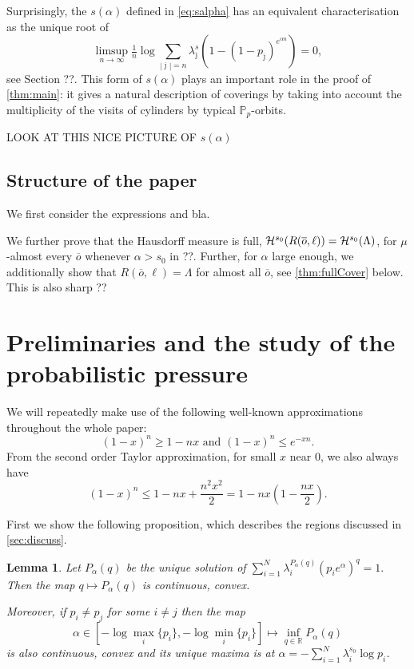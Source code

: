\documentclass[12pt,]{article}
\newtheorem{lemma}[theorem]{Lemma}
\theoremstyle{definition}
\theoremstyle{remark}
\renewcommand{\Bbb}[1]{\mathbb{#1}}
\newcommand{\bbP}{{\Bbb P}}
\newcommand{\bbR}{{\Bbb R}}        %
\newcommand{\cH}{{\cal H}}
\newcommand{\0}{\mathbf{0}}
\renewcommand{\le}{\leq}
\renewcommand{\ge}{\geq}
\newcommand{\bj}{{\overline  {\jmath}}}
\newcommand{\bo}{{\overline o}}
\begin{document}
Surprisingly, the $s(\alpha)$ defined in \cref{eq:salpha} has an equivalent characterisation as the unique root of
\begin{equation}\label{eq:probpres}
  \limsup_{n\to \infty} \tfrac 1n \log \sum_{|\bj|=n}\lambda_{\bj}^{s}\left(1-(1-p_{\bj})^{e^{\alpha n}}\right)=0,
\end{equation}
see Section ??. This form of $s(\alpha)$ plays an important role in the proof of \cref{thm:main}: it
gives a natural description of coverings by taking into account the multiplicity of the visits of
cylinders by typical $\bbP_p$-orbits.

{\color{red} LOOK AT THIS NICE PICTURE OF $s(\alpha)$}





\subsection{Structure of the paper}

We first consider the expressions and bla.

We further prove that the Hausdorff measure is full,
$\cH^{s_0}(R(\bo,\ell))=\cH^{s_0}(\Lambda)$, for $\mu$-almost every $\bo$ whenever
$\alpha>s_0$ in ??. Further, for $\alpha$ large enough, we additionally show that
$R(\bo,\ell)=\Lambda$ for almost all $\bo$, see \cref{thm:fullCover} below. This is also sharp ??

\section{Preliminaries and the study of the probabilistic pressure}

We will repeatedly make use of the following well-known approximations throughout the whole paper:
\begin{equation}\label{eq:repeat}
  (1-x)^n\ge 1-nx \text{ and } (1-x)^n\le e^{-xn}.
\end{equation}
From the second order Taylor approximation, for small $x$ near $0$, we also always have
\begin{equation}\label{eq:taylor}
  (1-x)^n\le 1-nx+\frac{n^2x^2}{2}=1-nx(1-\frac{nx}2).
\end{equation}

First we show the following proposition, which describes the regions discussed in \cref{sec:discuss}.

\begin{lemma}\label{thm:almostlegendre}
  Let $P_\alpha(q)$ be the unique solution of $\sum_{i=1}^N
  \lambda_i^{P_{\alpha}(q)}(p_ie^\alpha)^q=1.$ Then the map $q\mapsto P_\alpha(q)$ is continuous,
  convex.

  Moreover, if $p_i\neq p_j$ for some $i\neq j$ then the map
  \[
    \alpha\in[-\log\max_i\{p_i\},-\log\min_i\{p_i\}]\mapsto\inf_{q\in\bbR}P_\alpha(q)
  \]
  is also continuous, convex and its unique maxima is at $\alpha=- \sum_{i=1}^N \lambda_i^{s_0}\log p_i$.
\end{lemma}
\end{document}
